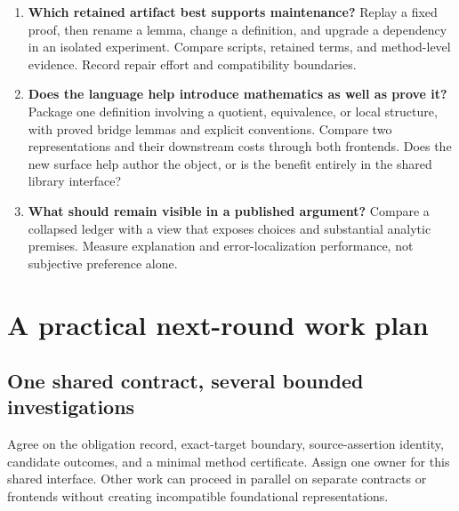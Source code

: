 \documentclass[11pt,letterpaper]{article}
\begin{document}
\begin{enumerate}[label=\textbf{Q\arabic*.},itemsep=.65em]
  notices with policy diagnostics; count false alarms and missed changes.
\item \textbf{Which retained artifact best supports maintenance?}
  Replay a fixed proof, then rename a lemma, change a definition, and upgrade a
  dependency in an isolated experiment. Compare scripts, retained terms, and
  method-level evidence. Record repair effort and compatibility boundaries.
\item \textbf{Does the language help introduce mathematics as well as prove it?}
  Package one definition involving a quotient, equivalence, or local structure,
  with proved bridge lemmas and explicit conventions. Compare two representations
  and their downstream costs through both frontends. Does the new surface help
  author the object, or is the benefit entirely in the shared library interface?
\item \textbf{What should remain visible in a published argument?}
  Compare a collapsed ledger with a view that exposes choices and substantial
  analytic premises. Measure explanation and error-localization performance,
  not subjective preference alone.
\end{enumerate}

\section{A practical next-round work plan}\label{sec:roadmap}
\subsection{One shared contract, several bounded investigations}
Agree on the obligation record, exact-target boundary, source-assertion identity,
candidate outcomes, and a minimal method certificate. Assign one owner for this
shared interface. Other work can proceed in parallel on separate contracts or
frontends without creating incompatible foundational representations.
\end{document}
